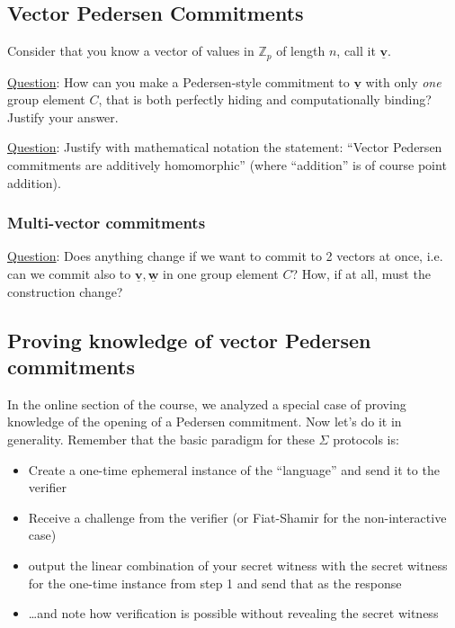 \documentclass[10pt,a4paper]{article}
\begin{document}
\subsection{Vector Pedersen Commitments}

Consider that you know a vector of values in $\mathbb{Z}_p$ of length $n$, call it $\underline{\mathbf{v}}$.

\vspace{5 pt}

\underline{Question}: How can you make a Pedersen-style commitment to $\underline{\mathbf{v}}$ with only \emph{one} group element $C$, that is both perfectly hiding and computationally binding? Justify your answer.

\vspace{5 pt}

\underline{Question}: Justify with mathematical notation the statement: ``Vector Pedersen commitments are additively homomorphic'' (where ``addition'' is of course point addition).

\subsubsection{Multi-vector commitments}

\underline{Question}: Does anything change if we want to commit to 2 vectors at once, i.e. can we commit also to $\underline{\textbf{v}}, \underline{\textbf{w}}$ in one group element $C$? How, if at all, must the construction change?

\subsection{Proving knowledge of vector Pedersen commitments}

In the online section of the course, we analyzed a special case of proving knowledge of the opening of a Pedersen commitment. Now let's do it in generality. Remember that the basic paradigm for these $\Sigma$ protocols is:

\begin{itemize}
\item Create a one-time ephemeral instance of the ``language'' and send it to the verifier
\item Receive a challenge from the verifier (or Fiat-Shamir for the non-interactive case)
\item output the linear combination of your secret witness with the secret witness for the one-time instance from step 1 and send that as the response
\item \ldots and note how verification is possible without revealing the secret witness
\end{itemize}
\end{document}
